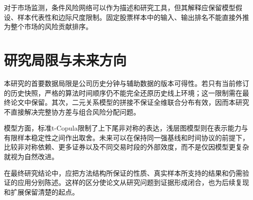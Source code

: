 对于市场监测，条件风险网络可以作为描述和研究工具，但其解释应保留模型假设、样本代表性和边际尺度限制。固定股票样本中的输入、输出排名不能直接外推为整个市场的风险贡献排序。

\section{研究局限与未来方向}
本研究的首要数据局限是公司历史分钟与辅助数据的版本可得性。若只有当前修订的历史快照，严格的算法时间顺序仍不能完全还原历史线上环境；这一限制需在最终论文中保留。其次，二元关系模型的拼接不保证全维联合分布有效，因而本研究不直接解决完整协方差与组合风险分配问题。

模型方面，标准t-Copula限制了上下尾非对称的表达，浅层图模型则在表示能力与有限样本稳定性之间作出取舍。未来可以在保持同一强基线和时间协议的前提下，比较非对称依赖、更多证券以及不同交易时段的外部效度，而不是仅因模型更复杂就视为自然改进。

在最终研究结论中，应把方法结构所保证的性质、真实样本所支持的结果和仍需验证的应用分别陈述。这样的区分使论文从研究问题到证据形成闭合，也为后续复现和扩展保留清楚的起点。
